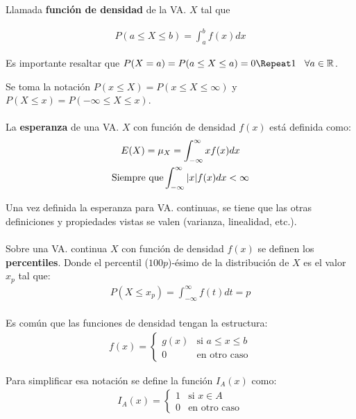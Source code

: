 \documentclass[../main.tex]{subfiles}
\begin{document}
Llamada \textbf{función de densidad} de la VA. \(X\) tal que

\begin{gather*}
  P(a \leq X \leq b) = \int_{a}^{b}f(x)dx
\end{gather*}

Es importante resaltar que \(P(X = a) = P(a \leq X \leq a) = 0 \tab \forall a \in \mathbb{R}\).

Se toma la notación \(P(x \leq X) = P(x \leq X \leq \infty)\) y \(P(X \leq x) = P(-\infty \leq X \leq x)\).

\paragraph{} La \textbf{esperanza} de una VA. \(X\) con función de densidad \(f(x)\) está definida como:
\begin{gather*}
  E(X) = \mu_{X} = \int_{-\infty}^{\infty}xf(x)dx \\
  \text{Siempre que} \int_{-\infty}^{\infty}|x|f(x)dx < \infty
\end{gather*}

Una vez definida la esperanza para VA. continuas, se tiene que las otras definiciones y propiedades vistas se valen (varianza, linealidad, etc.).

\paragraph{} Sobre una VA. continua \(X\) con función de densidad \(f(x)\) se definen los \textbf{percentiles}. Donde el percentil (\(100 p\))-ésimo de la distribución de \(X\) es el valor \(x_{p}\) tal que:
\begin{gather*}
  P(X \leq x_{p}) = \int_{-\infty}^{\infty}f(t)dt = p
\end{gather*}

\paragraph{} Es común que las funciones de densidad tengan la estructura:
\begin{gather*}
  f(x) = \begin{cases} g(x) & \text{si } a \leq x \leq b \\ 0 & \text{en otro caso} \end{cases}
\end{gather*}

Para simplificar esa notación se define la función \(I_{A}(x)\) como:
\begin{gather*}
  I_{A}(x) = \begin{cases} 1 & \text{si } x \in A \\ 0 & \text{en otro caso} \end{cases}
\end{gather*}
\end{document}
